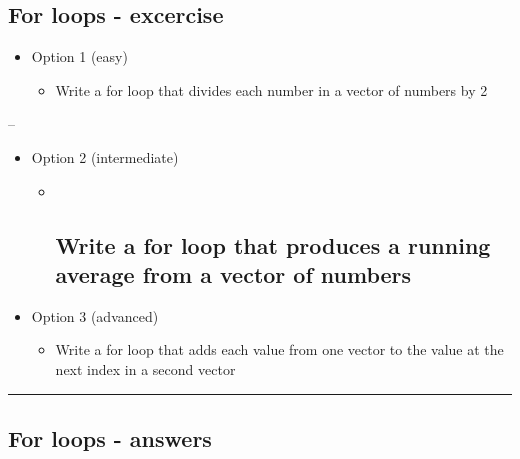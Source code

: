 \documentclass[]{article}
\providecommand{\tightlist}{%
  \setlength{\itemsep}{0pt}\setlength{\parskip}{0pt}}
\begin{document}
\hypertarget{for-loops---excercise}{%
\subsection{For loops - excercise}\label{for-loops---excercise}}

\begin{itemize}
\tightlist
\item
  Option 1 (easy)

  \begin{itemize}
  \tightlist
  \item
    Write a for loop that divides each number in a vector of numbers by
    2
  \end{itemize}
\end{itemize}

--

\begin{itemize}
\tightlist
\item
  Option 2 (intermediate)

  \begin{itemize}
  \item ~
    \hypertarget{write-a-for-loop-that-produces-a-running-average-from-a-vector-of-numbers}{%
    \subsection{Write a for loop that produces a running average from a
    vector of
    numbers}\label{write-a-for-loop-that-produces-a-running-average-from-a-vector-of-numbers}}
  \end{itemize}
\item
  Option 3 (advanced)

  \begin{itemize}
  \tightlist
  \item
    Write a for loop that adds each value from one vector to the value
    at the next index in a second vector
  \end{itemize}
\end{itemize}

\begin{center}\rule{0.5\linewidth}{\linethickness}\end{center}

\hypertarget{for-loops---answers}{%
\subsection{For loops - answers}\label{for-loops---answers}}
\end{document}
